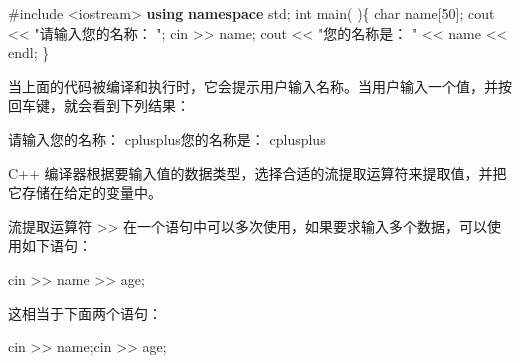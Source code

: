 \documentclass[
]{article}
\newenvironment{Shaded}{}{}
\newcommand{\DataTypeTok}[1]{\textcolor[rgb]{0.56,0.13,0.00}{#1}}
\newcommand{\DecValTok}[1]{\textcolor[rgb]{0.25,0.63,0.44}{#1}}
\newcommand{\ImportTok}[1]{#1}
\newcommand{\KeywordTok}[1]{\textcolor[rgb]{0.00,0.44,0.13}{\textbf{#1}}}
\newcommand{\NormalTok}[1]{#1}
\newcommand{\OperatorTok}[1]{\textcolor[rgb]{0.40,0.40,0.40}{#1}}
\newcommand{\PreprocessorTok}[1]{\textcolor[rgb]{0.74,0.48,0.00}{#1}}
\newcommand{\StringTok}[1]{\textcolor[rgb]{0.25,0.44,0.63}{#1}}
\begin{document}
\begin{Shaded}
\begin{Highlighting}[]
\PreprocessorTok{\#include }\ImportTok{\textless{}iostream\textgreater{}}\PreprocessorTok{ }
\KeywordTok{using} \KeywordTok{namespace}\NormalTok{ std}\OperatorTok{;} 
\DataTypeTok{int}\NormalTok{ main}\OperatorTok{(} \OperatorTok{)\{}  
    \DataTypeTok{char}\NormalTok{ name}\OperatorTok{[}\DecValTok{50}\OperatorTok{];}\NormalTok{    cout }\OperatorTok{\textless{}\textless{}} \StringTok{"请输入您的名称： "}\OperatorTok{;}   
\NormalTok{    cin }\OperatorTok{\textgreater{}\textgreater{}}\NormalTok{ name}\OperatorTok{;}\NormalTok{   cout }\OperatorTok{\textless{}\textless{}} \StringTok{"您的名称是： "} \OperatorTok{\textless{}\textless{}}\NormalTok{ name }\OperatorTok{\textless{}\textless{}}\NormalTok{ endl}\OperatorTok{;} 
\OperatorTok{\}}
\end{Highlighting}
\end{Shaded}

当上面的代码被编译和执行时，它会提示用户输入名称。当用户输入一个值，并按回车键，就会看到下列结果：

\begin{Shaded}
\begin{Highlighting}[]
\NormalTok{请输入您的名称： cplusplus您的名称是： cplusplus}
\end{Highlighting}
\end{Shaded}

C++
编译器根据要输入值的数据类型，选择合适的流提取运算符来提取值，并把它存储在给定的变量中。

流提取运算符 \textgreater\textgreater{}
在一个语句中可以多次使用，如果要求输入多个数据，可以使用如下语句：

\begin{Shaded}
\begin{Highlighting}[]
\NormalTok{cin }\OperatorTok{\textgreater{}\textgreater{}}\NormalTok{ name }\OperatorTok{\textgreater{}\textgreater{}}\NormalTok{ age}\OperatorTok{;}
\end{Highlighting}
\end{Shaded}

这相当于下面两个语句：

\begin{Shaded}
\begin{Highlighting}[]
\NormalTok{cin }\OperatorTok{\textgreater{}\textgreater{}}\NormalTok{ name}\OperatorTok{;}\NormalTok{cin }\OperatorTok{\textgreater{}\textgreater{}}\NormalTok{ age}\OperatorTok{;}
\end{Highlighting}
\end{Shaded}
\end{document}
